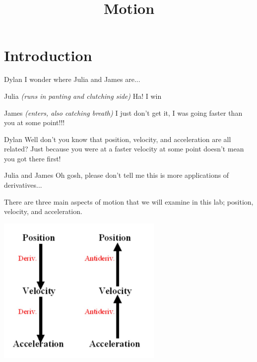 \documentclass{ximera}
\title{Motion}
\begin{document}
\maketitle
\section{Introduction}
\begin{dialogue}
\item[Dylan] I wonder where Julia and James are...
\item[Julia] \textit{(runs in panting and clutching side)} Ha! I win
\item[James] \textit{(enters, also catching breath)} I just don't get it, I was going faster than you at some point!!!
\item[Dylan] Well don't you know that position, velocity, and acceleration are all related? Just because you were at a faster velocity at some point doesn't mean you got there first!
\item[Julia and James] Oh gosh, please don't tell me this is more applications of derivatives...
\end{dialogue}
There are three main aspects of motion that we will examine in this lab; position, velocity, and acceleration.

\begin{image}
    \includegraphics[width=80mm]{motion.jpg}
\end{image}
\end{document}
